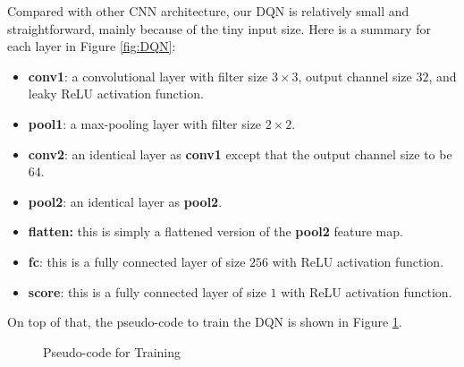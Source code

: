 \documentclass[letterpaper]{article} %
\makeatletter
\newcommand{\removelatexerror}{\let\@latex@error\@gobble}
\makeatother
\begin{document}
Compared with other CNN architecture, our DQN is relatively small and straightforward, mainly because of the tiny input size. Here is a summary for each layer in Figure \ref{fig:DQN}:
\begin{itemize}
  \item 
  {\bf conv1}: a convolutional layer with filter size $3\times 3$, output channel size $32$, and leaky ReLU activation function.
  \item 
  {\bf pool1}: a max-pooling layer with filter size $2\times 2$.
  \item 
  {\bf conv2}: an identical layer as {\bf conv1} except that the output channel size to be $64$.
  \item 
  {\bf pool2}: an identical layer as {\bf pool2}.  
  \item 
  {\bf flatten:} this is simply a flattened version of the {\bf pool2} feature map.
  \item 
  {\bf fc}: this is a fully connected layer of size $256$ with ReLU activation function.
  \item 
  {\bf score}: this is a fully connected layer of size $1$ with ReLU activation function.
\end{itemize}

On top of that, the pseudo-code to train the DQN is shown in Figure \ref{fig:code1}.

\begin{figure}[h!]
	\centering
	\begin{minipage}{.95\linewidth}
    \removelatexerror%
		\begin{algorithm}[H]
			\DontPrintSemicolon
		\end{algorithm}
	\end{minipage}
  \caption{Pseudo-code for Training}
  \label{fig:code1}
\end{figure}
\end{document}
